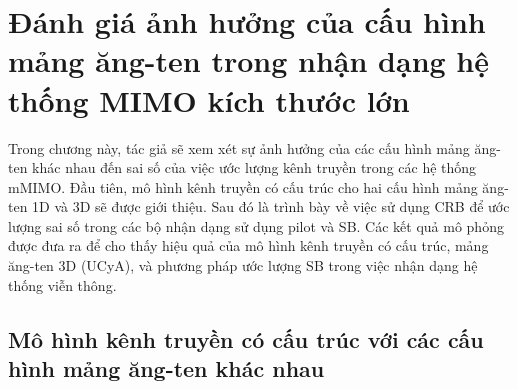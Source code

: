 \clearpage
{}

\setcounter{chapter}{1}
\chapter[{ĐÁNH GIÁ ẢNH HƯỞNG CỦA CẤU HÌNH MẢNG ĂNG-TEN TRONG NHẬN DẠNG HỆ THỐNG MIMO KÍCH THƯỚC LỚN}]{Đánh giá ảnh hưởng của cấu hình mảng ăng-ten trong nhận dạng hệ thống MIMO kích thước lớn}
\label{sec:CRB}

Trong chương này, tác giả sẽ xem xét sự ảnh hưởng của các cấu hình mảng ăng-ten khác nhau đến sai số của việc ước lượng kênh truyền trong các hệ thống mMIMO. Đầu tiên, mô hình kênh truyền có cấu trúc cho hai cấu hình mảng ăng-ten 1D và 3D sẽ được giới thiệu. Sau đó là trình bày về việc sử dụng CRB để ước lượng sai số trong các bộ nhận dạng sử dụng pilot và SB. Các kết quả mô phỏng được đưa ra để cho thấy hiệu quả của mô hình kênh truyền có cấu trúc, mảng ăng-ten 3D (UCyA), và phương pháp ước lượng SB trong việc nhận dạng hệ thống viễn thông.

\section{Mô hình kênh truyền có cấu trúc với các cấu hình mảng ăng-ten khác nhau}\label{SM}

